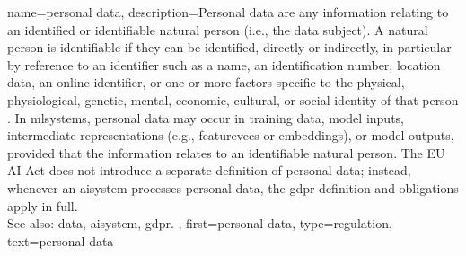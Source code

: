 



{name={personal data},
	description={Personal \gls{data} are any information 
		relating to an identified or identifiable natural 
		person (i.e., the \gls{data} subject). A natural person is identifiable 
		if they can be identified, directly or indirectly, in particular 
		by reference to an identifier such as a name, an identification number, 
		location \gls{data}, an online identifier, or one or more factors specific 
		to the physical, physiological, genetic, mental, economic, cultural, 
		or social identity of that person \cite{GDPR2016}.
		In \glspl{mlsystem}, personal \gls{data} may occur in \gls{training} \gls{data}, 
		\gls{model} inputs, intermediate representations (e.g., \glspl{featurevec} or embeddings), 
		or \gls{model} \glspl{output}, provided that the information relates to an identifiable natural 
		person. The EU AI Act does not introduce a separate definition of personal 
		\gls{data}; instead, whenever an \gls{aisystem} processes personal \gls{data}, 
		the \gls{gdpr} definition and obligations apply in full.
		\\
		See also: \gls{data}, \gls{aisystem}, \gls{gdpr}. },
  	first={personal data},
    	type=regulation, 
	text={personal data}
}

